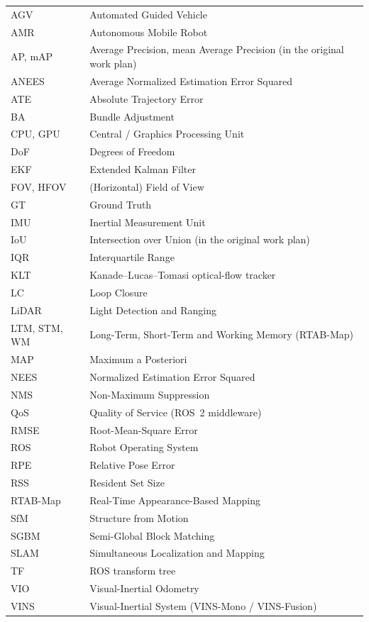\clearpage
{}

\noindent
\begin{tabular}{@{}p{}@{\ =\ }p{}@{}}
AGV & Automated Guided Vehicle \\
AMR & Autonomous Mobile Robot \\
AP, mAP & Average Precision, mean Average Precision (in the original work plan) \\
ANEES & Average Normalized Estimation Error Squared \\
ATE & Absolute Trajectory Error \\
BA & Bundle Adjustment \\
CPU, GPU & Central / Graphics Processing Unit \\
DoF & Degrees of Freedom \\
EKF & Extended Kalman Filter \\
FOV, HFOV & (Horizontal) Field of View \\
GT & Ground Truth \\
IMU & Inertial Measurement Unit \\
IoU & Intersection over Union (in the original work plan) \\
IQR & Interquartile Range \\
KLT & Kanade--Lucas--Tomasi optical-flow tracker \\
LC & Loop Closure \\
LiDAR & Light Detection and Ranging \\
LTM, STM, WM & Long-Term, Short-Term and Working Memory (RTAB-Map) \\
MAP & Maximum a Posteriori \\
NEES & Normalized Estimation Error Squared \\
NMS & Non-Maximum Suppression \\
QoS & Quality of Service (ROS~2 middleware) \\
RMSE & Root-Mean-Square Error \\
ROS & Robot Operating System \\
RPE & Relative Pose Error \\
RSS & Resident Set Size \\
RTAB-Map & Real-Time Appearance-Based Mapping \\
SfM & Structure from Motion \\
SGBM & Semi-Global Block Matching \\
SLAM & Simultaneous Localization and Mapping \\
TF & ROS transform tree \\
VIO & Visual-Inertial Odometry \\
VINS & Visual-Inertial System (VINS-Mono / VINS-Fusion) \\
\end{tabular}
\clearpage
